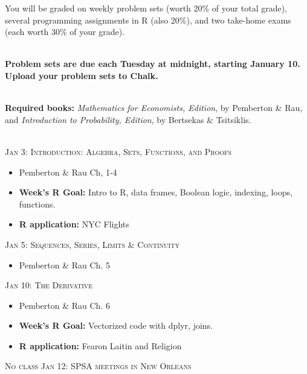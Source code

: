 \documentclass[11pt]{article}
\begin{document}
\vspace{.1in}

 You will be graded on weekly problem sets (worth 20\% of your total grade), several programming assignments in R (also 20\%), and two take-home exams (each worth 30\% of your grade).  

\ \\{\bf Problem sets are due each Tuesday at midnight, starting January 10.  Upload your problem sets to Chalk.}


\ \\{\bf Required books:} \textit{ Mathematics for Economists,  Edition},  by Pemberton \& Rau, and \textit{Introduction to Probability,  Edition}, by Bertsekas \& Tsitsiklis.


\newpage

\ \\ \noindent \textsc{Jan 3: Introduction: Algebra, Sets, Functions, and Proofs}

\begin{itemize}
\item Pemberton \& Rau Ch, 1-4

\item {\bf Week's R Goal:} Intro to R, data frames, Boolean logic, indexing, loops, functions.
\item {\bf R application: } NYC Flights
\end{itemize}


\noindent \textsc{Jan 5: Sequences, Series, Limits \& Continuity}

\begin{itemize}

\item Pemberton \& Rau Ch. 5


\end{itemize}

\noindent \textsc{Jan 10: The Derivative}

\begin{itemize}
\item Pemberton \& Rau Ch. 6

\item {\bf Week's R Goal:} Vectorized code with dplyr, joins.
\item {\bf R application: } Fearon Laitin and Religion 
\end{itemize}

\noindent \textsc{No class Jan 12: SPSA meetings in New Orleans}
\end{document}
